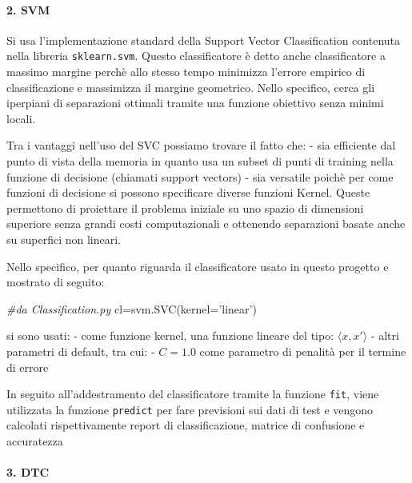 \documentclass[11pt]{article}
\newenvironment{Shaded}{}{}
\newcommand{\StringTok}[1]{\textcolor[rgb]{0.25,0.44,0.63}{{#1}}}
\newcommand{\CommentTok}[1]{\textcolor[rgb]{0.38,0.63,0.69}{\textit{{#1}}}}
\newcommand{\NormalTok}[1]{{#1}}
\newcommand{\OperatorTok}[1]{\textcolor[rgb]{0.40,0.40,0.40}{{#1}}}
\begin{document}
    \paragraph{2. SVM}\label{svm}

    Si usa l'implementazione standard della Support Vector Classification
contenuta nella libreria \texttt{sklearn.svm}. Questo classificatore è
detto anche classificatore a massimo margine perchè allo stesso tempo
minimizza l'errore empirico di classificazione e massimizza il margine
geometrico. Nello specifico, cerca gli iperpiani di separazioni ottimali
tramite una funzione obiettivo senza minimi locali.

Tra i vantaggi nell'uso del SVC possiamo trovare il fatto che: - sia
efficiente dal punto di vista della memoria in quanto usa un subset di
punti di training nella funzione di decisione (chiamati support vectors)
- sia versatile poichè per come funzioni di decisione si possono
specificare diverse funzioni Kernel. Queste permettono di proiettare il
problema iniziale su uno spazio di dimensioni superiore senza grandi
costi computazionali e ottenendo separazioni basate anche su superfici
non lineari.

Nello specifico, per quanto riguarda il classificatore usato in questo
progetto e mostrato di seguito:

\begin{Shaded}
\begin{Highlighting}[]
\CommentTok{#da Classification.py}
\NormalTok{cl}\OperatorTok{=}\NormalTok{svm.SVC(kernel}\OperatorTok{=}\StringTok{'linear'}\NormalTok{)    }
\end{Highlighting}
\end{Shaded}

si sono usati: - come funzione kernel, una funzione lineare del tipo:
\(\begin{equation*}  \langle x, x'\rangle  \end{equation*}\) - altri
parametri di default, tra cui: - \(C=1.0\) come parametro di penalità
per il termine di errore

In seguito all'addestramento del classificatore tramite la funzione
\texttt{fit}, viene utilizzata la funzione \texttt{predict} per fare
previsioni sui dati di test e vengono calcolati rispettivamente report
di classificazione, matrice di confusione e accuratezza

    \paragraph{3. DTC}\label{dtc}
\end{document}
